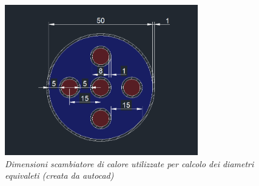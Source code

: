 \documentclass[a4paper,10pt]{article}                                                                                       %
\begin{document}
\begin{figure}[H]                                                                                                           %
  \centering                                                                                                                %
  \includegraphics[width=0.75\textwidth]{../final_doc/code_exports/imgs/heat_exchanger.png}                                 %
  \caption{\textit{Dimensioni scambiatore di calore utilizzate per calcolo dei diametri equivaleti (creata da autocad)}}    %
  \label{fig:he}                                                                                                            %
\end{figure}                                                                                                                %

\end{document}
